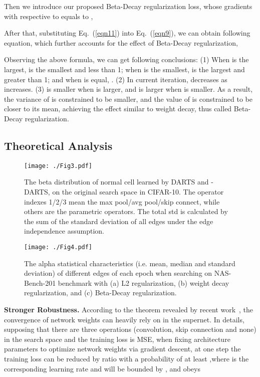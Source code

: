 \documentclass[10pt,twocolumn,letterpaper]{article}
\newcommand{\bp}[1]{\textcolor{black}{#1}}
\begin{document}
Then we introduce our proposed Beta-Decay regularization loss, whose gradients with respective to  equals to , 



After that, substituting Eq.~(\ref{eqn11}) into Eq.~(\ref{eqn9}), we can obtain following equation, which further accounts for the effect of Beta-Decay regularization,

Observing the above formula, we can get following conclusions: (1) When  is the largest,  is the smallest and less than 1; when  is the smallest,  is the largest and greater than 1; and when  is equal, . (2) In current iteration,  decreases as  increases. (3)  is smaller when  is larger, and  is larger when  is smaller. As a result, the variance of  is constrained to be smaller, and the value of  is constrained to be closer to its mean, achieving the effect similar to weight decay, thus called Beta-Decay regularization.

\subsection{Theoretical Analysis} \label{sec:Theo}
  \begin{figure}[t] 
	\centering
\texttt{[image: ./Fig3.pdf]}
\vspace{-8pt}
	\caption{The beta distribution of normal cell learned by DARTS and -DARTS, on the original search space in CIFAR-10. The operator indexes 1/2/3 mean the max pool/avg pool/skip connect, while others are the parametric operators. The total std is calculated by the sum of the standard deviation of all edges under the edge independence assumption.} \label{fig:4}
	\vspace{-10pt}	
\end{figure}

\begin{figure*}[t] 
	\centering
\texttt{[image: ./Fig4.pdf]}
\vspace{-12pt}
	\caption{The alpha statistical characteristics (i.e. mean, median and standard deviation) of different edges of each epoch when searching on NAS-Bench-201 benchmark with (a) L2 regularization, (b) weight decay regularization, and (c) Beta-Decay regularization.}
	\label{fig:2}
	\vspace{-10pt}	
\end{figure*}


\noindent\textbf{Stronger Robustness.} According to the theorem revealed by recent work~\cite{prdarts}, the convergence of network weights  can heavily rely on  in the supernet. In details, supposing that there are three operations (convolution, skip connection and none) in the search space and the training loss is MSE, when fixing architecture parameters to optimize network weights via gradient descent, at one step the training loss can be reduced by ratio   with \bp{a} probability of at least ,where  is the corresponding learning rate and will be bounded by , and  obeys
\end{document}
